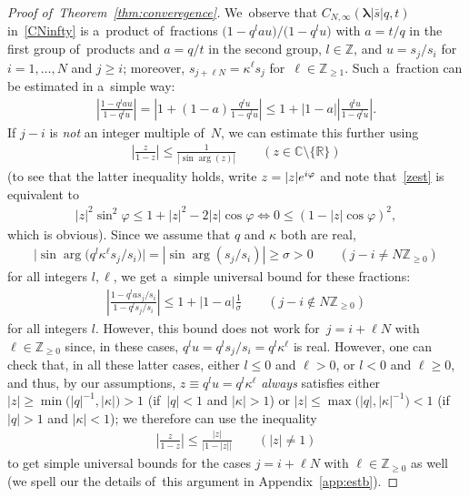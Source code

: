 \documentclass[11pt]{article}
\numberwithin{equation}{section}
\newcommand{\vlam}{\boldsymbol{\lambda}}
\newcommand{\bs}{\bar{s}}
\newcommand{\ee}{{\rm e}}
\newcommand{\ii}{{\rm i}}
\newcommand{\R}{{\mathbb R}}
\newcommand{\C}{{\mathbb C}}
\newcommand{\Z}{{\mathbb Z}}
\begin{document}
\begin{proof}[Proof of~Theorem~\ref{thm:converegence}]
We~observe that $C_{N,\infty}(\vlam|\bs|q,t)$ in~\eqref{CNinfty} is a~product of~fractions $\big(1-q^{l}au\big)/\big(1-q^l u\big)$ with $a=t/q$ in the first group of~products and $a=q/t$ in the second group,
 $l\in\Z$, and $u=s_j/s_i$ for~$i=1,\dots,N$ and $j\geq i$; moreover, $s_{j+\ell N}=\kappa^\ell s_j$ for~$\ell\in\Z_{\geq 1}$.
Such a~fraction can be estimated in a~simple way:
\begin{gather*}
\left|\frac{1-q^{l}au}{1-q^l u}\right| = \left|1+(1-a)\frac{q^l u}{1-q^l u} \right|\leq 1+|1-a|\left|\frac{q^l u}{1-q^l u}\right|\!.
\end{gather*}
If $j-i$ is {\em not} an integer multiple of~$N$, we can estimate this further using
\begin{gather}
\label{zest}
\left| \frac{z}{1-z}\right| \leq \frac1{|\sin\arg(z)|} \qquad (z\in\C\setminus\{\R\})
\end{gather}
(to see that the latter inequality holds, write $z=|z|\ee^{\ii\varphi}$ and note that~\eqref{zest} is equivalent to
\begin{gather*}
|z|^2\sin^2\varphi \leq 1+|z|^2-2|z|\cos\varphi\Leftrightarrow 0\leq (1-|z|\cos\varphi)^2,
\end{gather*}
which is obvious). Since we assume that $q$ and $\kappa$ both are real,
\begin{gather*}
\big|\sin\arg\big(q^l \kappa^{\ell }s_j/s_i\big)\big| = |\sin\arg(s_j/s_i)| \geq \sigma>0\qquad (j-i\neq N\Z_{\geq 0})
\end{gather*}
for all integers $l,\ell$, we get a~simple universal bound for these fractions:
\begin{gather*}
\left|\frac{1-q^l a s_j/s_i}{1-q^l s_j/s_i}\right| \leq 1+|1-a|\frac{1}{\sigma} \qquad (j-i \notin N\Z_{\geq 0})
\end{gather*}
for all integers $l$. However, this bound does not work for~$j=i+\ell N$ with $\ell\in\Z_{\geq 0}$ since, in these cases, $q^l u=q^l s_j/s_i=q^l \kappa^\ell$ is real.
However, one can check that, in all these latter cases, either $l\leq 0$ and $\ell>0$, or $l<0$ and $\ell\geq 0$, and thus, by our assumptions, $z\equiv q^lu=q^l \kappa^\ell$ {\em always}
satisfies either $|z|\geq \min\big(|q|^{-1},|\kappa|\big)>1$ (if~$|q|<1$ and $|\kappa|>1$) or $|z|\leq \max\big(|q|,|\kappa|^{-1}\big)<1$ (if~$|q|>1$ and $|\kappa|<1$); we therefore can use the inequality
\begin{gather*}
\left| \frac{z}{1-z}\right| \leq \frac{|z|}{|1-|z||} \qquad (|z|\neq 1)
\end{gather*}
to get simple universal bounds for the cases $j=i+\ell N$ with $\ell\in\Z_{\geq 0}$ as well (we spell our the details of~this argument in Appendix~\ref{app:estb}).

\end{proof}
\end{document}
